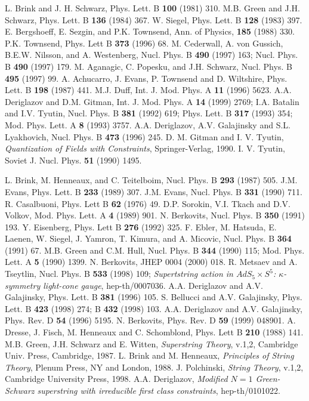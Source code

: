 \documentclass[a4paper]{article}
\begin{document}
\begin{thebibliography}{nn}
\bibitem{} L. Brink and J. H. Schwarz, Phys. Lett. B {\bf 100}
(1981) 310.
\bibitem{} M.B. Green and J.H. Schwarz, Phys. Lett. B {\bf 136}
(1984) 367.
\bibitem{} W. Siegel, Phys. Lett. B {\bf 128} (1983) 397.
\bibitem{} E. Bergshoeff, E. Sezgin, and P.K. Townsend, Ann. of Physics,
{\bf 185} (1988) 330.
\bibitem{} P.K. Townsend, Phys. Lett B {\bf 373} (1996) 68.
\bibitem{} M. Cederwall, A. von Gussich, B.E.W. Nilsson, and A.
Westenberg, Nucl. Phys. B {\bf 490} (1997) 163; Nucl. Phys. B {\bf 490}
(1997) 179.
\bibitem{} M. Aganagic, C. Popesku, and J.H. Schwarz, Nucl. Phys.
B {\bf 495} (1997) 99.
\bibitem{} A. Achucarro, J. Evans, P. Townsend and D. Wiltshire,
Phys. Lett. B {\bf 198} (1987) 441.
\bibitem{} M.J. Duff, Int. J. Mod. Phys. A {\bf 11} (1996) 5623.
\bibitem{} A.A. Deriglazov and D.M. Gitman, Int. J. Mod. Phys. A 
{\bf 14} (1999) 2769;
\bibitem{} I.A. Batalin and I.V. Tyutin, Nucl. Phys. B {\bf 381} (1992)
619; Phys. Lett. B {\bf 317} (1993) 354; Mod. Phys. Lett. A {\bf 8}
(1993) 3757.
\bibitem{} A.A. Deriglazov, A.V. Galajinsky and 
S.L. Lyakhovich, Nucl. Phys. B {\bf 473} (1996) 245. 
\bibitem{} D. M. Gitman and I. V. Tyutin, {\em Quantization of Fields
with Constraints}, Springer-Verlag, 1990.
\bibitem{} I. V. Tyutin, Soviet J. Nucl. Phys. {\bf 51} (1990) 1495. 
\item{} L. Brink, M. Henneaux, and C. Teitelboim, Nucl. Phys. B {\bf
293} (1987) 505.
\bibitem{} J.M. Evans, Phys. Lett. B {\bf 233} (1989) 307.
\bibitem{} J.M. Evans, Nucl. Phys. B {\bf 331} (1990) 711.
\bibitem{} R. Casalbuoni, Phys. Lett B {\bf 62} (1976) 49.
\bibitem{} D.P. Sorokin, V.I. Tkach and D.V. Volkov, Mod. Phys. Lett. 
A {\bf 4} (1989) 901.
\bibitem{} N. Berkovits, Nucl. Phys. B {\bf 350} (1991) 193.
 Y. Eisenberg, Phys. Lett B {\bf 276} (1992) 325.
\bibitem{} F. Ebler, M. Hatsuda, E. Laenen, W. Siegel, J. Yamron, T.
Kimura, and A. Micovic, Nucl. Phys. B {\bf 364} (1991) 67.
\bibitem{} M.B. Green and C.M. Hull, Nucl. Phys. B {\bf 344} (1990) 115;
Mod. Phys. Lett. A {\bf 5} (1990) 1399.
\bibitem{} N. Berkovits, JHEP 0004 (2000) 018.
\bibitem{} R. Metsaev and A. Tseytlin, Nucl. Phys. B {\bf 533} (1998) 
109; {\em Supertstring action in $AdS_5\times S^5$: $\kappa$-symmetry 
light-cone gauge}, hep-th/0007036.
\bibitem{} A.A. Deriglazov and A.V. Galajinsky,  
Phys. Lett. B {\bf 381} (1996) 105.
\bibitem{} S. Bellucci and A.V. Galajinsky,
Phys. Lett. B {\bf 423} (1998) 274; B {\bf 432} (1998) 103.
\bibitem{} A.A. Deriglazov and A.V. Galajinsky,
Phys. Rev. D {\bf 54} (1996) 5195.
\bibitem{} N. Berkovits, Phys. Rev. D {\bf 59} (1999) 048901.
\bibitem{} A. Dresse, J. Fisch, M. Henneaux and C. Schomblond, 
Phys. Lett B {\bf 210} (1988) 141.
\bibitem{} M.B. Green, J.H. Schwarz and E. Witten,
{\it{Superstring Theory}}, v.1,2, Cambridge Univ. Press, Cambridge, 1987. 
\bibitem{} L. Brink and M. Henneaux, {\it{Principles of String Theory}},
Plenum Press, NY and London, 1988.
\bibitem{} J. Polchinski, {\it{String Theory}}, v.1,2,
Cambridge University Press, 1998.
\bibitem{} A.A. Deriglazov, {\em{Modified $N=1$ Green-Schwarz superstring 
with irreducible first class constraints}}, hep-th/0101022.
\end{thebibliography}
\end{document}
